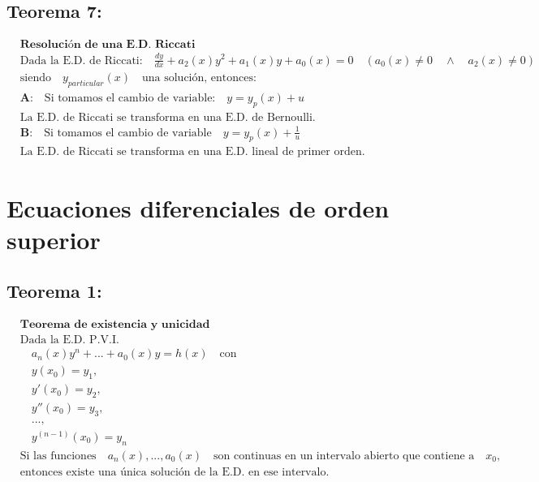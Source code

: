 \documentclass[a4paper,12pt,numbers=noenddot]{scrreprt}
\begin{document}
\subsection*{Teorema 7:}
\begin{align*}
    &\textbf{Resolución de una E.D. Riccati}\\
    &\text{Dada la E.D. de Riccati:} \quad \frac{dy}{dx} + a_2(x)y^2 + a_1(x)y + a_0(x)=0 \quad (a_0(x) \neq 0 \quad \wedge \quad a_2(x)\neq 0)\\
    &\text{siendo} \quad y_{particular}(x) \quad \text{una solución, entonces:}\\
    &\textbf{A:} \quad \text{Si tomamos el cambio de variable:} \quad y = y_{p}(x) + u\\
    &\text{La E.D. de Riccati se transforma en una E.D. de Bernoulli.}\\
    &\textbf{B:} \quad \text{Si tomamos el cambio de variable} \quad y = y_p(x) + \frac{1}{u}\\
    &\text{La E.D. de Riccati se transforma en una E.D. lineal de primer orden.}
\end{align*}

\newpage
\section*{Ecuaciones diferenciales de orden superior}
\subsection*{Teorema 1:}
\begin{align*}
    &\textbf{Teorema de existencia y unicidad}\\
    &\text{Dada la E.D. P.V.I.}\\
    &\quad a_n(x)y^{n}+...+a_0(x)y = h(x) \quad \text{con}\\
    &\quad y(x_0) = y_1,\\
    &\quad y'(x_0) = y_2,\\
    &\quad y''(x_0) = y_3,\\
    &\quad ...,\\
    &\quad y^{(n-1)}(x_0) = y_n\\
    &\text{Si las funciones} \quad a_n(x),...,a_0(x) \quad \text{son continuas en un intervalo abierto que contiene a} \quad x_0,\\
    &\text{entonces existe una única solución de la E.D. en ese intervalo.}
\end{align*}
\end{document}
